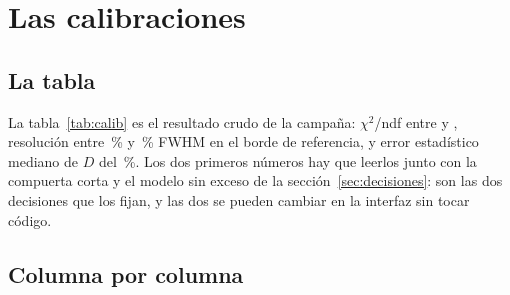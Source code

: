 \documentclass[11pt,a4paper]{article}
\begin{document}
\section{Las \NCorridas{} calibraciones}
\label{sec:calibraciones}

\subsection{La tabla}

La tabla~\ref{tab:calib} es el resultado crudo de la campaña: $\chi^2$/ndf
entre \ChiMin{} y \ChiMax{}, resolución entre \FwhmMin\,\% y \FwhmMax\,\% FWHM
en el borde de referencia, y error estadístico mediano de $D$ del
\ErrRelMediano\,\%. Los dos primeros números hay que leerlos junto con la
compuerta corta y el modelo sin exceso de la sección~\ref{sec:decisiones}: son
las dos decisiones que los fijan, y las dos se pueden cambiar en la interfaz
sin tocar código.

\begin{center}
\label{tab:calib}
{\footnotesize\setlength{\tabcolsep}{4pt}}
\end{center}

\subsection{Columna por columna}
\end{document}
